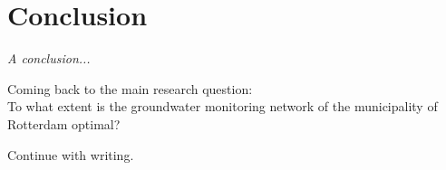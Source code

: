 \chapter{Conclusion}
\label{chapter:conclusion}

\emph{A conclusion...}

Coming back to the main research question: \\
To what extent is the groundwater monitoring network of the municipality of Rotterdam optimal?

Continue with writing. 